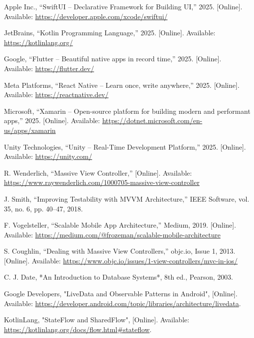 \documentclass[12pt]{report}
\begin{document}
\begin{thebibliography}{1}
  Apple Inc., ``SwiftUI – Declarative Framework for Building UI,'' 2025. [Online]. Available: \url{https://developer.apple.com/xcode/swiftui/}

  JetBrains, ``Kotlin Programming Language,'' 2025. [Online]. Available: \url{https://kotlinlang.org/}

  Google, ``Flutter – Beautiful native apps in record time,'' 2025. [Online]. Available: \url{https://flutter.dev/}

  Meta Platforms, ``React Native – Learn once, write anywhere,'' 2025. [Online]. Available: \url{https://reactnative.dev/}

  Microsoft, ``Xamarin – Open-source platform for building modern and performant apps,'' 2025. [Online]. Available: \url{https://dotnet.microsoft.com/en-us/apps/xamarin}

  Unity Technologies, ``Unity – Real-Time Development Platform,'' 2025. [Online]. Available: \url{https://unity.com/}


  R. Wenderlich, ``Massive View Controller,'' [Online]. Available: \url{https://www.raywenderlich.com/1000705-massive-view-controller}


  J. Smith, ``Improving Testability with MVVM Architecture,'' IEEE Software, vol. 35, no. 6, pp. 40–47, 2018.

  F. Vogelsteller, ``Scalable Mobile App Architecture,'' Medium, 2019. [Online]. Available: \url{https://medium.com/@frozeman/scalable-mobile-architecture}

  S. Coughlin, ``Dealing with Massive View Controllers,'' objc.io, Issue 1, 2013. [Online]. Available: \url{https://www.objc.io/issues/1-view-controllers/mvc-in-ios/}
  

  C. J. Date, *An Introduction to Database Systems*, 8th ed., Pearson, 2003.
  
  Google Developers, "LiveData and Observable Patterns in Android", [Online]. Available: \url{https://developer.android.com/topic/libraries/architecture/livedata}.
  
  KotlinLang, "StateFlow and SharedFlow", [Online]. Available: \url{https://kotlinlang.org/docs/flow.html#stateflow}.
  

\end{thebibliography}
\end{document}

